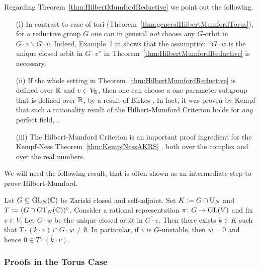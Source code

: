 \begin{remark} \label{rem:HilbertMumfordReductive}
	Regarding Theorem~\ref{thm:HilbertMumfordReductive} we point out the following.
	\begin{itemize}
		\item[(i)] In contrast to case of tori (Theorem~\ref{thm:generalHilbertMumfordTorus}), for a reductive group $G$ one can in general \emph{not} choose any $G$-orbit in $\overline{G \cdot v} \backslash G \cdot v$. Indeed, Example~1 in \cite[§6.8]{PopovVinberg} shows that the assumption ``$G \cdot w$ is the unique closed orbit in $\overline{G \cdot v}$'' in Theorem~\ref{thm:HilbertMumfordReductive} is necessary.
		
		\item[(ii)] If the whole setting in Theorem~\ref{thm:HilbertMumfordReductive} is defined over $\mathbb R$ and $v \in V_\mathbb R$, then one can choose a one-parameter subgroup that is defined over $\mathbb R$, by a result of Birkes \cite[Theorem~5.2]{birkes1971orbits}. In fact, it was proven by Kempf that such a rationality result of the Hilbert-Mumford Criterion holds for \emph{any} perfect field, \cite[Corollary~4.3]{kempf1978instability}.
		
		\item[(iii)] The Hilbert-Mumford Criterion is an important proof ingredient for the Kempf-Ness Theorem~\ref{thm:KempfNessAKRS} , both over the complex and over the real numbers.
		\hfill\remSymbol
	\end{itemize}
\end{remark}

We will need the following result, that is often shown as an intermediate step to prove Hilbert-Mumford.

\begin{theorem} \label{thm:Wallach3-25}
	Let $G \subseteq \operatorname{GL}_N(\mathbb C)$ be Zariski closed and self-adjoint. Set $K := G \cap \operatorname{U}_N$ and $T:= (G \cap \operatorname{GT}_N(\mathbb C))^\circ$. Consider a rational representation $\pi \colon G \to \operatorname{GL}(V)$ and fix $v \in V$. Let $G \cdot w$ be the unique closed orbit in $\overline{G \cdot v}$. Then there exists $k \in K$ such that $\overline{T \cdot (k \cdot v)} \cap G \cdot w \neq \emptyset$. In particular, if $v$ is $G$-unstable, then $w=0$ and hence $0 \in \overline{T \cdot (k \cdot v)}$.
\end{theorem}


\subsubsection{Proofs in the Torus Case}

